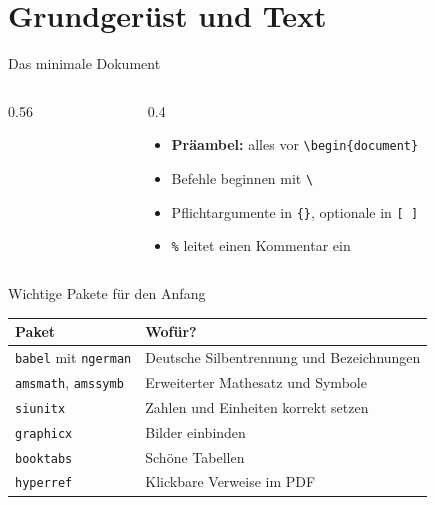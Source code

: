 \section{Grundgerüst und Text}

\begin{frame}[fragile]{Das minimale Dokument}
  \begin{columns}[c]
    \begin{column}{0.56\textwidth}
    \end{column}
    \begin{column}{0.4\textwidth}
      \begin{itemize}
        \item \textbf{Präambel:} alles vor \texttt{\textbackslash begin\{document\}}
        \item Befehle beginnen mit \texttt{\textbackslash}
        \item Pflichtargumente in \texttt{\{\}}, optionale in \texttt{[\,]}
        \item \texttt{\%} leitet einen Kommentar ein
      \end{itemize}
    \end{column}
  \end{columns}
\end{frame}

\begin{frame}{Wichtige Pakete für den Anfang}
  \centering
  \begin{tabular}{@{}p{4.6cm}p{6.8cm}@{}}
    \toprule
    \textbf{Paket} & \textbf{Wofür?}\\
    \midrule
    \texttt{babel} mit \texttt{ngerman} & Deutsche Silbentrennung und Bezeichnungen\\
    \texttt{amsmath}, \texttt{amssymb} & Erweiterter Mathesatz und Symbole\\
    \texttt{siunitx} & Zahlen und Einheiten korrekt setzen\\
    \texttt{graphicx} & Bilder einbinden\\
    \texttt{booktabs} & Schöne Tabellen\\
    \texttt{hyperref} & Klickbare Verweise im PDF\\
    \bottomrule
  \end{tabular}
\end{frame}

